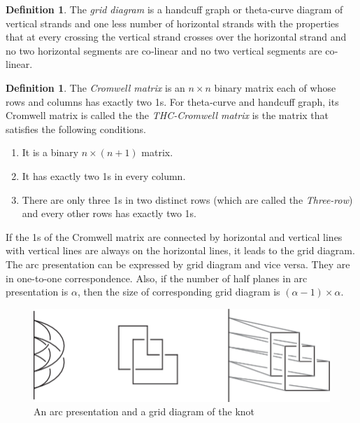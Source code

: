 \documentclass{article}
\theoremstyle{definition}
\newtheorem{defn}[thm]{Definition}
\theoremstyle{theorem}
\theoremstyle{proposition}
\theoremstyle{corollary}
\begin{document}
\begin{defn}
    The \textit{grid diagram} is a handcuff graph or theta‐curve diagram of vertical strands and one less number of horizontal strands with the properties that at every crossing the vertical strand crosses over the horizontal strand and no two horizontal segments are co‐linear and no two vertical segments are co‐linear.
\end{defn}

\begin{defn}
   The \textit{Cromwell matrix} is an $n \times n$ binary matrix each of whose rows and columns has exactly two 1s. 
   For theta‐curve and handcuff graph, its Cromwell matrix is called the 
   the \textit{THC-Cromwell matrix} is the matrix that satisfies the following conditions.
\end{defn}
\begin{enumerate}
    \item It is a binary $n\times(n+1)$ matrix.
    \item It has exactly two 1s in every column.
    \item There are only three 1s in two distinct rows (which are called the \textit{Three-row}) and every other rows has exactly two 1s.
\end{enumerate}

If the 1s of the Cromwell matrix are connected by horizontal and vertical lines with vertical lines are always on the horizontal lines, it leads to the grid diagram. The arc presentation can be expressed by grid diagram and vice versa. They are in one-to-one correspondence. Also, if the number of half planes in arc presentation is $\alpha$, then the size of corresponding grid diagram is $(\alpha - 1) \times \alpha$.\\

\begin{figure}[h]
    \centerline{\includegraphics[width=0.5\linewidth]{An arc presentation and a grid diagram of the knot.png}}
    \caption{An arc presentation and a grid diagram of the knot}
    \label{figure_2}
\end{figure}
\end{document}
